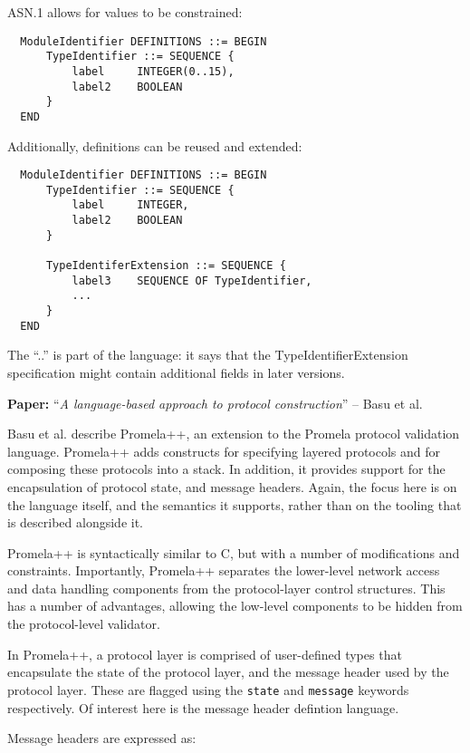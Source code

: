 \documentclass[10pt,a4paper]{article}
\newcommand{\paper}[3]{\vspace{4mm}\noindent\textbf{Paper:} ``\textit{#1}'' -- #2 \cite{#3}\vspace{3mm}}
\begin{document}
ASN.1 allows for values to be constrained:

\begin{verbatim}
  ModuleIdentifier DEFINITIONS ::= BEGIN
      TypeIdentifier ::= SEQUENCE {
          label     INTEGER(0..15),
          label2    BOOLEAN
      }
  END  
\end{verbatim}

Additionally, definitions can be reused and extended:

\begin{verbatim}
  ModuleIdentifier DEFINITIONS ::= BEGIN
      TypeIdentifier ::= SEQUENCE {
          label     INTEGER,
          label2    BOOLEAN
      }
    
      TypeIdentiferExtension ::= SEQUENCE {
          label3    SEQUENCE OF TypeIdentifier,
          ...
      }
  END
\end{verbatim}

The ``..'' is part of the language: it says that the TypeIdentifierExtension specification
might contain additional fields in later versions.

\paper{A language-based approach to protocol construction}{Basu et al.}{basu1997language}

Basu et al. describe Promela++, an extension to the Promela protocol validation language.
Promela++ adds constructs for specifying layered protocols and for composing these
protocols into a stack. In addition, it provides support for the encapsulation of
protocol state, and message headers. Again, the focus here is on the language itself, and
the semantics it supports, rather than on the tooling that is described alongside it.

Promela++ is syntactically similar to C, but with a number of modifications and
constraints. Importantly, Promela++ separates the lower-level network access and data
handling components from the protocol-layer control structures. This has a number of
advantages, allowing the low-level components to be hidden from the protocol-level
validator.

In Promela++, a protocol layer is comprised of user-defined types that encapsulate the
state of the protocol layer, and the message header used by the protocol layer. These
are flagged using the \texttt{state} and \texttt{message} keywords respectively. Of 
interest here is the message header defintion language.

Message headers are expressed as:
\end{document}
